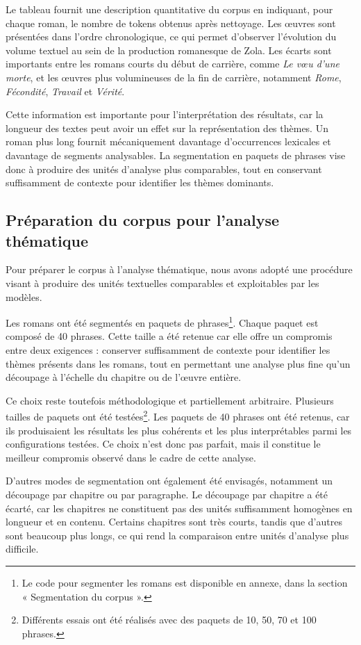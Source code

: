 Le tableau fournit une description quantitative du corpus en indiquant, pour chaque roman, le nombre de tokens obtenus après nettoyage. Les œuvres sont présentées dans l'ordre chronologique, ce qui permet d'observer l'évolution du volume textuel au sein de la production romanesque de Zola. Les écarts sont importants entre les romans courts du début de carrière, comme \textit{Le vœu d'une morte}, et les œuvres plus volumineuses de la fin de carrière, notamment \textit{Rome}, \textit{Fécondité}, \textit{Travail} et \textit{Vérité}.

Cette information est importante pour l'interprétation des résultats, car la longueur des textes peut avoir un effet sur la représentation des thèmes. Un roman plus long fournit mécaniquement davantage d'occurrences lexicales et davantage de segments analysables. La segmentation en paquets de phrases vise donc à produire des unités d'analyse plus comparables, tout en conservant suffisamment de contexte pour identifier les thèmes dominants.
\subsection{Préparation du corpus pour l'analyse thématique}

Pour préparer le corpus à l'analyse thématique, nous avons adopté une procédure visant à produire des unités textuelles comparables et exploitables par les modèles.

Les romans ont été segmentés en paquets de phrases\footnote{Le code pour segmenter les romans est disponible en annexe, dans la section « Segmentation du corpus ».}. Chaque paquet est composé de 40 phrases. Cette taille a été retenue car elle offre un compromis entre deux exigences : conserver suffisamment de contexte pour identifier les thèmes présents dans les romans, tout en permettant une analyse plus fine qu'un découpage à l'échelle du chapitre ou de l'œuvre entière.

Ce choix reste toutefois méthodologique et partiellement arbitraire. Plusieurs tailles de paquets ont été testées\footnote{Différents essais ont été réalisés avec des paquets de 10, 50, 70 et 100 phrases.}. Les paquets de 40 phrases ont été retenus, car ils produisaient les résultats les plus cohérents et les plus interprétables parmi les configurations testées. Ce choix n'est donc pas parfait, mais il constitue le meilleur compromis observé dans le cadre de cette analyse.

D'autres modes de segmentation ont également été envisagés, notamment un découpage par chapitre ou par paragraphe. Le découpage par chapitre a été écarté, car les chapitres ne constituent pas des unités suffisamment homogènes en longueur et en contenu. Certains chapitres sont très courts, tandis que d'autres sont beaucoup plus longs, ce qui rend la comparaison entre unités d'analyse plus difficile.

